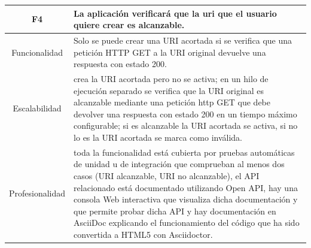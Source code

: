 \documentclass{article}
\begin{document}
\begin{table}[hbtp]
    \footnotesize
    \centering
    \settowidth{}
    \setlength\extrarowheight{5pt}
    \begin{tabulary}{\textwidth}{ C L }
        \textbf{F4} & La aplicación verificará que la uri que el usuario quiere crear es alcanzable. 
        \\
    \hline
    
    Funcionalidad & Solo se puede crear una URI acortada si se verifica que una petición HTTP GET
    a la URI original devuelve una respuesta con estado 200.\\
        
    Escalabilidad & crea la URI acortada pero no se activa; en un hilo de ejecución separado se
    verifica que la URI original es alcanzable mediante una petición http GET que debe devolver
    una respuesta con estado 200 en un tiempo máximo configurable; si es alcanzable la URI
    acortada se activa, si no lo es la URI acortada se marca como inválida. \\

    Profesionalidad & toda la funcionalidad está cubierta por pruebas automáticas de unidad u de
    integración que comprueban al menos dos casos (URI alcanzable, URI no alcanzable), el API
    relacionado está documentado utilizando Open API, hay una consola Web interactiva que
    visualiza dicha documentación y que permite probar dicha API y hay documentación en
    AsciiDoc explicando el funcionamiento del código que ha sido convertida a HTML5 con
    Asciidoctor.
    \end{tabulary}
    
\end{table}
 
\end{document}
